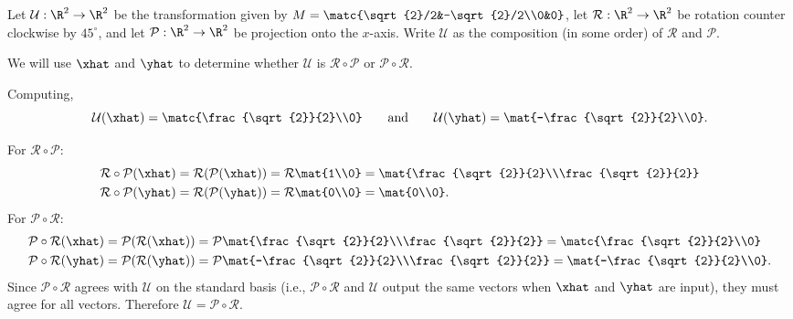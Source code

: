 \begin{example}
	Let $\mathcal U:\R^2\to\R^2$ be the transformation given by $M=\matc{\sqrt{2}/2&-\sqrt{2}/2\\0&0}$,
	let $\mathcal R:\R^2\to\R^2$ be rotation counter clockwise by $45^\circ$, and let $\mathcal P:\R^2\to\R^2$
	be projection onto the $x$-axis.
	Write $\mathcal U$ as the composition (in some order) of $\mathcal R$ and $\mathcal P$.

	We will use $\xhat$ and $\yhat$ to determine whether $\mathcal U$ is $\mathcal R\circ\mathcal P$ or
	$\mathcal P\circ \mathcal R$.
	
	Computing,
	\[
	    \mathcal U(\xhat)=\matc{\frac{\sqrt{2}}{2}\\0}\\\qquad\text{and}\qquad \mathcal U(\yhat)=\mat{-\frac{\sqrt{2}}{2}\\0}.
	\]
	
	For $\mathcal R\circ \mathcal P$:
	\begin{align*}
	    \mathcal R\circ \mathcal P(\xhat)=\mathcal R(\mathcal P(\xhat))&=\mathcal R\mat{1\\0}=\mat{\frac{\sqrt{2}}{2}\\\frac{\sqrt{2}}{2}}\\
	    \mathcal R\circ \mathcal P(\yhat)=\mathcal R(\mathcal P(\yhat))&=\mathcal R\mat{0\\0}=\mat{0\\0}.
	\end{align*}
	For $\mathcal P\circ \mathcal R$:
	\begin{align*}
	    \mathcal P\circ \mathcal R(\xhat)=\mathcal P(\mathcal R(\xhat))&=\mathcal P\mat{\frac{\sqrt{2}}{2}\\\frac{\sqrt{2}}{2}}=\matc{\frac{\sqrt{2}}{2}\\0}\\
	    \mathcal P\circ \mathcal R(\yhat)=\mathcal P(\mathcal R(\yhat))&=\mathcal P\mat{-\frac{\sqrt{2}}{2}\\\frac{\sqrt{2}}{2}}=\mat{-\frac{\sqrt{2}}{2}\\0}.
	\end{align*}
	Since $\mathcal P\circ \mathcal R$ agrees with $\mathcal U$ on the standard basis (i.e., 
	$\mathcal P\circ\mathcal R$ and $\mathcal U$ output
	the same vectors when $\xhat$ and $\yhat$ are input), they must agree for all vectors. Therefore $\mathcal U=\mathcal P\circ \mathcal R$.
\end{example}


